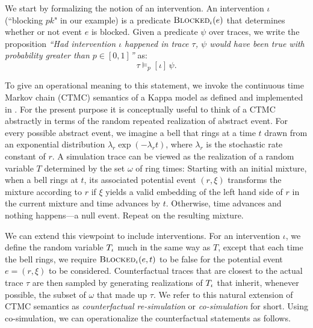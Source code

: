 We start by formalizing the notion of an intervention. An intervention
$\iota$ (``blocking $pk$" in our example) is a predicate
${\textsc{Blocked}}_{\iota}(e)$ that determines whether or not event $e$ is
blocked. Given a predicate $\psi$ over traces, we write
the proposition \textit{``Had intervention $\iota$ happened in trace
  $\tau$, $\psi$ would have been true with probability greater than
  $p \in [0,1]$''} as:
\[ \tau \models_p [\iota] \, \psi.
\]

To give an operational meaning to this statement, we invoke the
continuous time Markov chain (CTMC) semantics of a Kappa model as
defined and implemented in
\cite{DanosEtAl-APLAS07,BoutillierEK17}. For the present purpose it is
conceptually useful to think of a CTMC abstractly in terms of the
random repeated realization of abstract event. For every possible
abstract event, we imagine a bell that rings at a time $t$ drawn from
an exponential distribution $\lambda_r\exp(-\lambda_r t)$, where
$\lambda_r$ is the stochastic rate constant of $r$. A simulation trace
can be viewed as the realization of a random variable $T$ determined
by the set $\omega$ of ring times: Starting with an initial mixture,
when a bell rings at $t$, its associated potential event $(r, \xi)$
transforms the mixture according to $r$ if $\xi$ yields a valid
embedding of the left hand side of $r$ in the current mixture and time
advances by $t$. Otherwise, time advances and nothing happens---a null
event. Repeat on the resulting mixture.

We can extend this viewpoint to include interventions. For an
intervention $\iota$, we define the random variable ${T_\iota}{}$ much in
the same way as $T$, except that each time the bell rings, we require
${\textsc{Blocked}}_{\iota}(e, t)$ to be false for the potential event
$e=(r, \xi)$ to be considered.  Counterfactual traces that are closest
to the actual trace $\tau$ are then sampled by generating realizations
of ${T_\iota}{}$ that inherit, whenever possible, the subset of $\omega$
that made up $\tau$. 
We refer to this natural extension of CTMC semantics as
\textit{counterfactual re-simulation} or \textit{co-simulation} for
short. Using co-simulation, we can operationalize the counterfactual
statements as follows.

